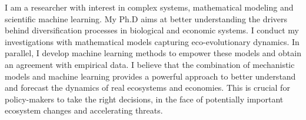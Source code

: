 %
%
%
\par{
I am a researcher with interest in complex systems, mathematical modeling and scientific machine learning.
My Ph.D aims at better understanding the drivers behind diversification processes in biological and economic systems. I conduct my investigations with mathematical models capturing eco-evolutionary dynamics. In parallel, I develop machine learning methods to empower these models and obtain an agreement with empirical data. I believe that the combination of mechanistic models and machine learning provides a powerful approach to better understand and forecast the dynamics of real ecosystems and economies. This is crucial for policy-makers to take the right decisions, in the face of potentially important ecosystem changes and accelerating threats.}